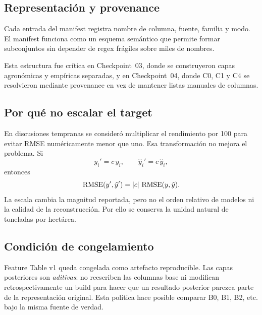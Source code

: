 \subsection{Representación y provenance}

Cada entrada del manifest registra nombre de columna, fuente, familia y modo. El manifest
funciona como un esquema semántico que permite formar subconjuntos sin depender de regex
frágiles sobre miles de nombres.

Esta estructura fue crítica en Checkpoint~03, donde se construyeron capas agronómicas y
empíricas separadas, y en Checkpoint~04, donde C0, C1 y C4 se resolvieron mediante provenance
en vez de mantener listas manuales de columnas.

\subsection{Por qué no escalar el target}

En discusiones tempranas se consideró multiplicar el rendimiento por 100 para evitar RMSE
numéricamente menor que uno. Esa transformación no mejora el problema. Si
\[
y_i'=c\,y_i,\qquad \hat y_i'=c\,\hat y_i,
\]
entonces
\[
\operatorname{RMSE}(y',\hat y')=|c|\,\operatorname{RMSE}(y,\hat y).
\]
La escala cambia la magnitud reportada, pero no el orden relativo de modelos ni la calidad de
la reconstrucción. Por ello se conserva la unidad natural de toneladas por hectárea.

\subsection{Condición de congelamiento}

Feature Table v1 queda congelada como artefacto reproducible. Las capas posteriores son
\emph{aditivas}: no reescriben las columnas base ni modifican retrospectivamente un build para
hacer que un resultado posterior parezca parte de la representación original. Esta política
hace posible comparar B0, B1, B2, etc. bajo la misma fuente de verdad.
